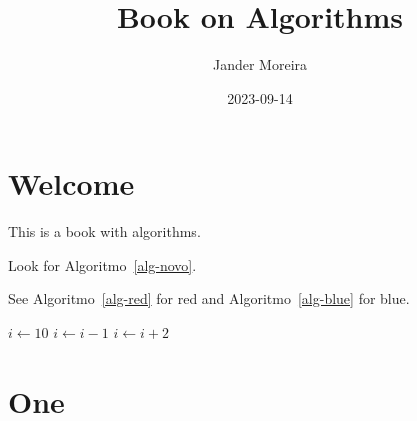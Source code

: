 \documentclass[
  letterpaper,
]{scrbook}
\title{Book on Algorithms}
\author{Jander Moreira}
\date{2023-09-14}
\renewcommand*\contentsname{Table of contents}
\newcommand\contentsname{Table of contents}
\begin{document}
\frontmatter
\maketitle



\renewcommand*\contentsname{Table of contents}
{
\setcounter{tocdepth}{2}
\tableofcontents
}
\mainmatter
{}

\chapter*{Welcome}\label{welcome}


This is a book with algorithms.

Look for Algoritmo~\ref{alg-novo}.

See Algoritmo~\ref{alg-red} for red and Algoritmo~\ref{alg-blue} for
blue.

\begin{algorithm}
\caption{\label{alg-novo}}
\begingroup%

\begin{algorithmic}
    \State $i \gets 10$
        \State $i \gets i-1$
    \Else
            \State $i \gets i+2$
        \EndIf
    \EndIf 
\end{algorithmic}

\endgroup
\end{algorithm}


\chapter{One}\label{one}
\end{document}
